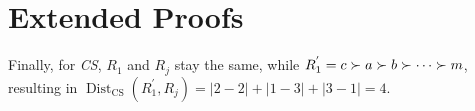 
\chapter{Extended Proofs}

\label{AppendixA} %

Finally, for \emph{CS}, $R_{1}$ and $R_{j}$ stay the same, while $R_{1}^{'} = c \succ a \succ b \succ \cdots \succ m$, resulting in $\operatorname{Dist}_{\text{CS}}(R_{1}^{'}, R_{j}) = |2-2| + |1-3| + |3-1| = 4$.


